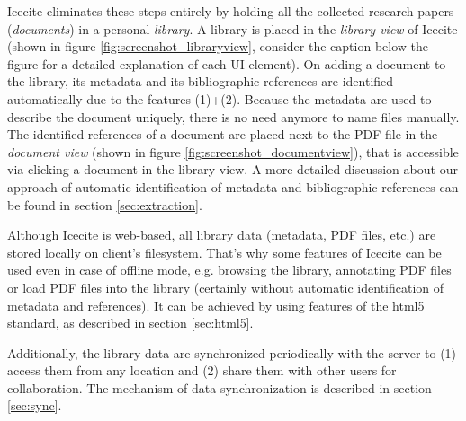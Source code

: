Icecite eliminates these steps entirely by holding all the collected research papers (\textit{documents}) in a personal \textit{library}. A library is placed in the \textit{library view} of Icecite (shown in figure \ref{fig:screenshot_libraryview}, consider the caption below the figure for a detailed explanation of each UI-element). On adding a document to the library, its metadata and its bibliographic references are identified automatically due to the features (1)+(2). Because the metadata are used to describe the document uniquely, there is no need anymore to name files manually. The identified references of a document are placed next to the PDF file in the \textit{document view} (shown in figure \ref{fig:screenshot_documentview}), that is accessible via clicking a document in the library view. A more detailed discussion about our approach of automatic identification of metadata and bibliographic references can be found in section \ref{sec:extraction}.    

Although Icecite is web-based, all library data (metadata, PDF files, etc.) are stored locally on client's filesystem. That's why some features of Icecite can be used even in case of offline mode, e.g. browsing the library, annotating PDF files or load PDF files into the library (certainly without automatic identification of metadata and references). It can be achieved by using features of the html5 standard, as described in section \ref{sec:html5}.	

Additionally, the library data are synchronized periodically with the server to (1) access them from any location and (2) share them with other users for collaboration. The mechanism of data synchronization is described in section \ref{sec:sync}.

